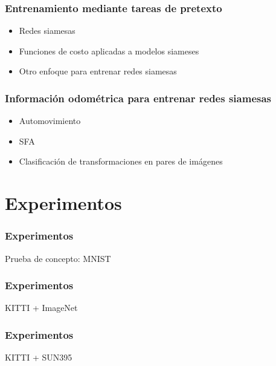 \documentclass{beamer}
\begin{document}
\begin{frame}
\frametitle{Entrenamiento mediante tareas de pretexto}
\begin{itemize}
    \item Redes siamesas 
    \item Funciones de costo aplicadas a modelos siameses 
    \item Otro enfoque para entrenar redes siamesas 
\end{itemize}
\end{frame}






\begin{frame}
\frametitle{Información odométrica para entrenar redes siamesas}
\begin{itemize}
    \item Automovimiento 
    \item SFA 
    \item Clasificación de transformaciones en pares de imágenes 
\end{itemize}
\end{frame}




\section{Experimentos}
\begin{frame}
\frametitle{Experimentos}
Prueba de concepto: MNIST 
\end{frame}




\begin{frame}
\frametitle{Experimentos}
KITTI + ImageNet 
\end{frame}





\begin{frame}
\frametitle{Experimentos}
KITTI + SUN395 
\end{frame}
\end{document}
